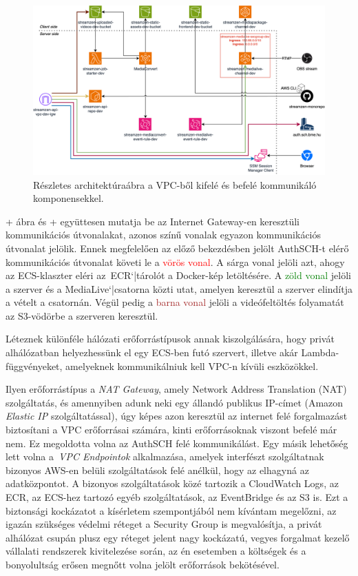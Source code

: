 \begin{figure}
  \centering
  \includegraphics[width=150mm, keepaspectratio]{figures/dipterv_nonvpc.png}
  \caption{Részletes architektúraábra a VPC-ből kifelé és befelé kommunikáló komponensekkel.}
  \label{fig:nonvpc}
\end{figure}

\Az+ ábra és \az+ együttesen mutatja be az Internet Gateway-en keresztüli kommunikációs útvonalakat, azonos színű vonalak egyazon kommunikációs útvonalat jelölik. Ennek megfelelően az előző bekezdésben jelölt AuthSCH-t elérő kommunikációs útvonalat követi le a \textcolor{red}{vörös vonal}. A \textcolor{amber}{sárga vonal} jelöli azt, ahogy az ECS-klaszter eléri az~ECR`|tárolót a Docker-kép letöltésére. A \textcolor{green}{zöld vonal} jelöli a szerver és a MediaLive`|csatorna közti utat, amelyen keresztül a szerver elindítja a vételt a csatornán. Végül pedig a \textcolor{brown}{barna vonal} jelöli a videófeltöltés folyamatát az S3-vödörbe a szerveren keresztül.

Léteznek különféle hálózati erőforrástípusok annak kiszolgálására, hogy privát alhálózatban helyezhessünk el egy ECS-ben futó szervert, illetve akár Lambda-függvényeket, amelyeknek kommunikálniuk kell VPC-n kívüli eszközökkel.

Ilyen erőforrástípus a \emph{NAT Gateway}, amely Network Address Translation (NAT) szolgáltatás, és amennyiben adunk neki egy állandó publikus IP-címet (Amazon \emph{Elastic IP} szolgáltatással), úgy képes azon keresztül az internet felé forgalmazást biztosítani a VPC erőforrásai számára, kinti erőforrásoknak viszont befelé már nem. Ez megoldotta volna az AuthSCH felé kommunikálást. Egy másik lehetőség lett volna a~\emph{VPC Endpointok} alkalmazása, amelyek interfészt szolgáltatnak bizonyos AWS-en belüli szolgáltatások felé anélkül, hogy az elhagyná az adatközpontot. A bizonyos szolgáltatások közé tartozik a CloudWatch Logs, az ECR, az ECS-hez tartozó egyéb szolgáltatások, az EventBridge és az S3 is.\cite{vpcEndpoints} Ezt a biztonsági kockázatot a kísérletem szempontjából nem kívántam megelőzni, az igazán szükséges védelmi réteget a Security Group is megvalósítja, a privát alhálózat csupán plusz egy réteget jelent nagy kockázatú, vegyes forgalmat kezelő vállalati rendszerek kivitelezése során, az én esetemben a költségek és a bonyolultság erősen megnőtt volna jelölt erőforrások bekötésével.

